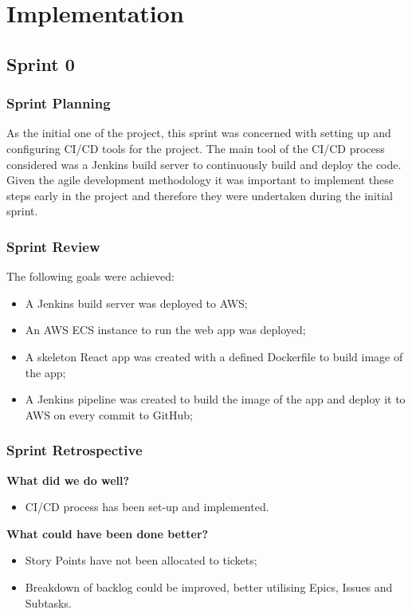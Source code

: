 \section{Implementation}
	\subsection{Sprint 0}
		\subsubsection{Sprint Planning}
		As the initial one of the project, this sprint was concerned with setting up and configuring CI/CD tools for the project. The main tool of the CI/CD process considered was a Jenkins build server to continuously build and deploy the code. Given the agile development methodology it was important to implement these steps early in the project and therefore they were undertaken during the initial sprint.

		\subsubsection{Sprint Review}
		The following goals were achieved:
		\begin{itemize}
			\item A Jenkins build server was deployed to AWS;
			\item An AWS ECS instance to run the web app was deployed;
			\item A skeleton React app was created with a defined Dockerfile to build image of the app;
			\item A Jenkins pipeline was created to build the image of the app and deploy it to AWS on every commit to GitHub;
		\end{itemize}
		
		\subsubsection{Sprint Retrospective}
		\textbf{What did we do well?}
		\begin{itemize}	
			\item CI/CD process has been set-up and implemented.
		\end{itemize}
		
		\noindent\textbf{What could have been done better?}
		\begin{itemize}
			\item Story Points have not been allocated to tickets;
			\item Breakdown of backlog could be improved, better utilising Epics, Issues and Subtasks.
		\end{itemize}
		
